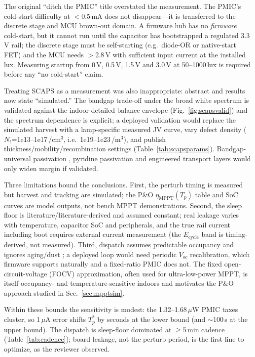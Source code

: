 \documentclass[10pt, conference, letterpaper]{IEEEtran}
\begin{document}
The original ``ditch the PMIC'' title overstated the measurement. The PMIC's cold-start difficulty at $<$0.5\,mA \cite{brunner2024harvestics} does not disappear---it is transferred to the discrete stage and MCU brown-out domain. A firmware hub has no \emph{firmware} cold-start, but it cannot run until the capacitor has bootstrapped a regulated 3.3\,V rail; the discrete stage must be self-starting (e.g.\ diode-OR or native-start FET) and the MCU needs $>$2.8\,V with sufficient input current at the installed lux. Measuring startup from 0\,V, 0.5\,V, 1.5\,V and 3.0\,V at 50--1000\,lux is required before any ``no cold-start'' claim.

Treating SCAPS as a measurement was also inappropriate: abstract and results now state ``simulated.'' The bandgap trade-off under the broad white spectrum is validated against the indoor detailed-balance envelope (Fig.~\ref{fig:scapsvalid}) and the spectrum dependence is explicit; a deployed validation would replace the simulated harvest with a lamp-specific measured JV curve, vary defect density ($N_t$=1e13--1e17\,/cm$^3$, i.e.\ 1e19--1e23\,/m$^3$), and publish thickness/mobility/recombination settings (Table~\ref{tab:scapsparams}). Bandgap-universal passivation \cite{lin2024bandgap}, pyridine passivation \cite{han2025pyridine} and engineered transport layers \cite{datt2024engineered} would only widen margin if validated.

Three limitations bound the conclusions. First, the perturb timing is measured but harvest and tracking are simulated; the P\&O $\eta_{\mathrm{MPPT}}(T_p)$ table and SoC curves are model outputs, not bench MPPT demonstrations. Second, the sleep floor is literature/literature-derived and assumed constant; real leakage varies with temperature, capacitor SoC and peripherals, and the true rail current including boot requires external current measurement (the $E_{\mathrm{cycle}}$ band is timing-derived, not measured). Third, dispatch assumes predictable occupancy and ignores aging/dust \cite{asuo2026stability}; a deployed loop would need periodic $V_{oc}$ recalibration, which firmware supports naturally and a fixed-ratio PMIC does not. The fixed open-circuit-voltage (FOCV) approximation, often used for ultra-low-power MPPT, is itself occupancy- and temperature-sensitive indoors \cite{azlor2025focv} and motivates the P\&O approach studied in Sec.~\ref{sec:mpptsim}.

Within these bounds the sensitivity is modest: the 1.32--1.68\,$\mu$W PMIC taxes cluster, so 1\,$\mu$A error shifts $T_p^*$ by seconds at the lower bound (and $\sim$100\,s at the upper bound). The dispatch is sleep-floor dominated at $\ge$5\,min cadence (Table~\ref{tab:cadence}); board leakage, not the perturb period, is the first line to optimize, as the reviewer observed.
\end{document}
